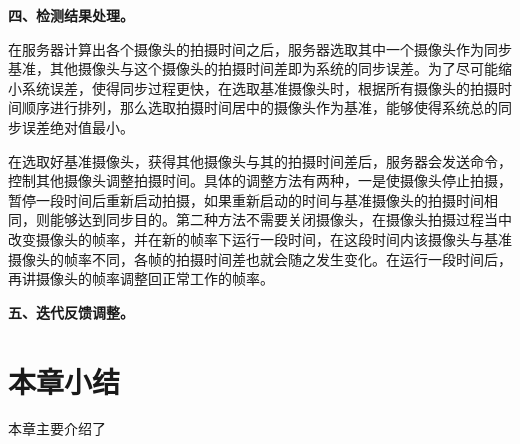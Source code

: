 \textbf{四、检测结果处理。}

在服务器计算出各个摄像头的拍摄时间之后，服务器选取其中一个摄像头作为同步基准，其他摄像头与这个摄像头的拍摄时间差即为系统的同步误差。为了尽可能缩小系统误差，使得同步过程更快，在选取基准摄像头时，根据所有摄像头的拍摄时间顺序进行排列，那么选取拍摄时间居中的摄像头作为基准，能够使得系统总的同步误差绝对值最小。

在选取好基准摄像头，获得其他摄像头与其的拍摄时间差后，服务器会发送命令，控制其他摄像头调整拍摄时间。具体的调整方法有两种，一是使摄像头停止拍摄，暂停一段时间后重新启动拍摄，如果重新启动的时间与基准摄像头的拍摄时间相同，则能够达到同步目的。第二种方法不需要关闭摄像头，在摄像头拍摄过程当中改变摄像头的帧率，并在新的帧率下运行一段时间，在这段时间内该摄像头与基准摄像头的帧率不同，各帧的拍摄时间差也就会随之发生变化。在运行一段时间后，再讲摄像头的帧率调整回正常工作的帧率。



\textbf{五、迭代反馈调整。}

\section{本章小结}

本章主要介绍了




















































































